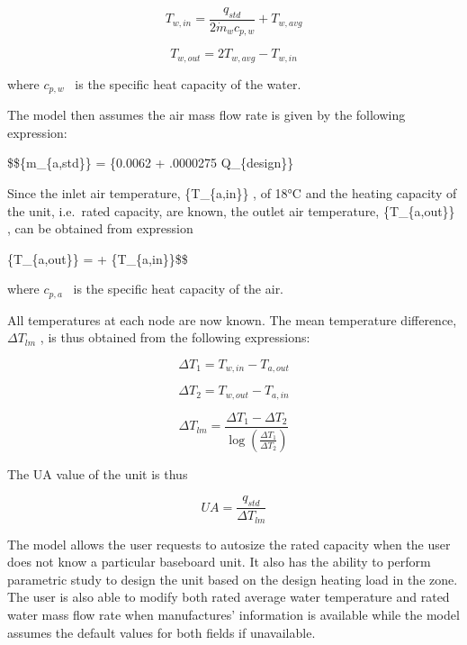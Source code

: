 \begin{equation}
{T_{w,in}} = \frac{{{q_{std}}}}{{2\dot m{}_w{c_{p,w}}}} + {T_{w,avg}}
\end{equation}

\begin{equation}
{T_{w,out}} = 2{T_{w,avg}} - {T_{w,in}}
\end{equation}

where \({c_{p,w}}\) ~is the specific heat capacity of the water.

The model then assumes the air mass flow rate is given by the following expression:

\$\$\{\dot m\_\{a,std\}\} = \{0.0062 + .0000275 \dot Q\_\{design\}\}

Since the inlet air temperature, \{T\_\{a,in\}\} , of 18°C and the heating capacity of the unit, i.e.~rated capacity, are known, the outlet air temperature, \{T\_\{a,out\}\} , can be obtained from expression

\{T\_\{a,out\}\} =  + \{T\_\{a,in\}\}\$\$

where \({c_{p,a}}\) ~is the specific heat capacity of the air.

All temperatures at each node are now known. The mean temperature difference, \(\Delta {T_{lm}}\) , is thus obtained from the following expressions:

\begin{equation}
\Delta {T_1} = {T_{w,in}} - {T_{a,out}}
\end{equation}

\begin{equation}
\Delta {T_2} = {T_{w,out}} - {T_{a,in}}
\end{equation}

\begin{equation}
\Delta {T_{lm}} = \frac{{\Delta {T_1} - \Delta {T_2}}}{{\log \left( {\frac{{\Delta {T_1}}}{{\Delta {T_2}}}} \right)}}
\end{equation}

The UA value of the unit is thus

\begin{equation}
UA = \frac{{{q_{std}}}}{{\Delta {T_{lm}}}}
\end{equation}

The model allows the user requests to autosize the rated capacity when the user does not know a particular baseboard unit. It also has the ability to perform parametric study to design the unit based on the design heating load in the zone. The user is also able to modify both rated average water temperature and rated water mass flow rate when manufactures' information is available while the model assumes the default values for both fields if unavailable.

